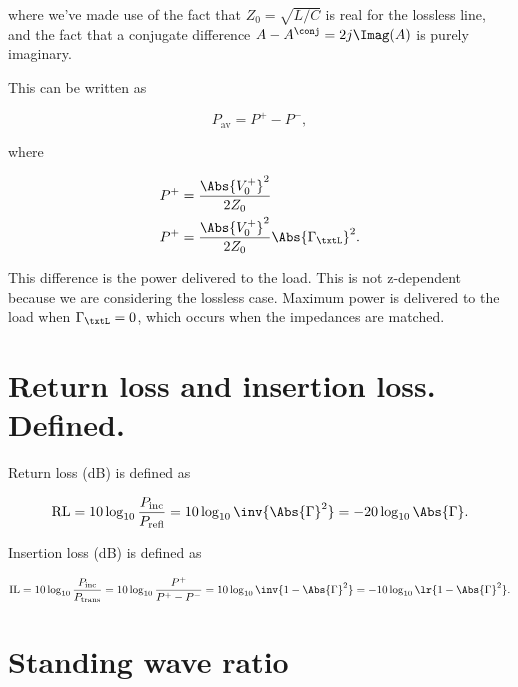 where we've made use of the fact that \( Z_0 = \sqrt{L/C} \) is real for the lossless line, and the fact that a conjugate difference \( A - A^\conj = 2 j \Imag(A) \) is purely imaginary.

This can be written as

\begin{dmath}\label{eqn:uwaves4TransmissionLines:1020}
P_{ \textrm{av}} = P^{+} - P^{-},
\end{dmath}

where

\begin{equation}\label{eqn:uwaves4TransmissionLines:1040}
\begin{aligned}
P^{+} &= \frac{ \Abs{V_0^{+}}^2 }{2 Z_0 } \\
P^{+} &= \frac{ \Abs{V_0^{+}}^2 }{2 Z_0 } \Abs{\Gamma_\txtL}^2.
\end{aligned}
\end{equation}

This difference is the power delivered to the load.  This is not z-dependent because we are considering the lossless case.  Maximum power is delivered to the load when \( \Gamma_\txtL = 0 \), which occurs when the impedances are matched.

\section{Return loss and insertion loss.  Defined.}

Return loss (dB) is defined as

\begin{dmath}\label{eqn:uwaves4TransmissionLines:1060}
\textrm{RL} 
= 10 \log_{10} \frac{P_{\textrm{inc}}}{P_{\textrm{refl}}} 
= 10 \log_{10} \inv{\Abs{\Gamma}^2}
= -20 \log_{10} \Abs{\Gamma}.
\end{dmath}

Insertion loss (dB) is defined as

\begin{dmath}\label{eqn:uwaves4TransmissionLines:1080}
\textrm{IL} 
= 10 \log_{10} \frac{P_{\textrm{inc}}}{P_{\textrm{trans}}} 
= 10 \log_{10} \frac{P^{+}}{P^{+} - P^{-}}
= 10 \log_{10} \inv{1 - \Abs{\Gamma}^2}
= -10 \log_{10} \lr{ 1 - \Abs{\Gamma}^2 }.
\end{dmath}

\section{Standing wave ratio}

